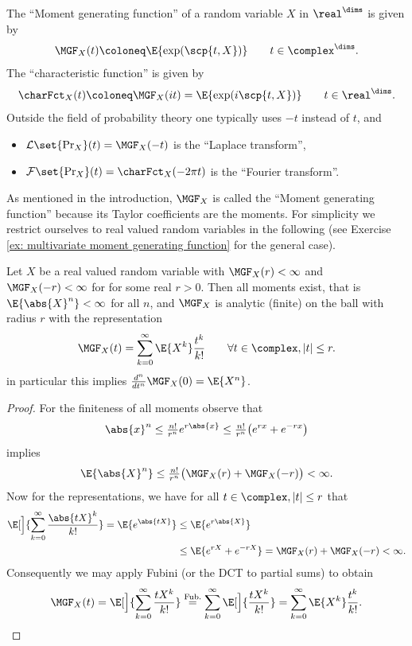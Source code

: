 \begin{definition}
    The ``Moment generating function'' of a random variable \(X\) in 
    \(\real^\dims\) is given by
    \[
        \MGF_X(t) \coloneq \E{\exp(\scp{t, X})}
        \qquad t\in \complex^\dims.
    \]
    The ``characteristic function'' is given by
    \[
        \charFct_X(t) \coloneq \MGF_X(i t) = \E{\exp(i\scp{t,X})}
        \qquad t\in \real^\dims.
    \]
    Outside the field of probability theory one typically uses \(-t\) 
    instead of \(t\), and 
    \begin{itemize}[noitemsep]
        \item \(\mathcal{L}\set{\Pr_X}(t) = \MGF_X(-t)\) is the ``Laplace
        transform'',
        \item \(\mathcal{F}\set{\Pr_X}(t) = \charFct_X(-2\pi t)\) is the ``Fourier
        transform''. 
    \end{itemize}
\end{definition}

As mentioned in the introduction, \(\MGF_X\) is called the ``Moment
generating function'' because its Taylor coefficients are the moments.
For simplicity we restrict ourselves to real valued random variables
in the following (see Exercise \ref{ex: multivariate moment generating function}
for the general case).

\begin{lemma}
    \label{lem: moment generating function representation}
    Let \(X\) be a real valued random variable with \(\MGF_{X}(r) < \infty\) and
    \(\MGF_{X}(-r) < \infty\) for for some real \(r>0\). Then all moments exist,
    that is \(\E{\abs{X}^n} <\infty\) for all \(n\), and \(\MGF_X\) is
    analytic (finite) on the ball with radius \(r\) with the representation
    \[
        \MGF_X(t) = \sum_{k=0}^\infty \E{X^k}\frac{t^k}{k!} \qquad \forall t\in \complex, |t| \le r.
    \]
    in particular this implies \(\frac{d^n}{dt^n} \MGF_X(0) = \E{X^n}\).
\end{lemma}
\begin{proof}
    For the finiteness of all moments observe that
    \[
        \abs{x}^n
        \le \tfrac{n!}{r^n} e^{r\abs{x}}
        \le \tfrac{n!}{r^n} \bigl(e^{r x} + e^{-r x}\bigr)
    \]
    implies
    \[
        \E{\abs{X}^n} \le \tfrac{n!}{r^n} \bigl(\MGF_X(r) + \MGF_X(-r)\bigr) < \infty.
    \]
    Now for the representations, we have for all \(t\in \complex, |t| \le r\)
    that
    \[\begin{aligned}
        \E[\Big]{\sum_{k=0}^\infty \frac{\abs{tX}^k}{k!}}
        = \E{e^{\abs{tX}}}
        &\le \E{e^{r\abs{X}}}
        \\
        &\le \E{e^{r X} + e^{-r X}}
        = \MGF_X(r) + \MGF_X(-r) < \infty.
    \end{aligned}
    \]
    Consequently we may apply Fubini (or the DCT to partial sums) to obtain
    \[
        \MGF_X(t)
        = \E[\Big]{\sum_{k=0}^\infty \frac{tX^k}{k!}}
        \overset{\text{Fub.}}= 
        \sum_{k=0}^\infty \E[\Big]{\frac{tX^k}{k!}}
        = \sum_{k=0}^\infty \E{X^k}\frac{t^k}{k!}.
        \qedhere
    \]
\end{proof}

